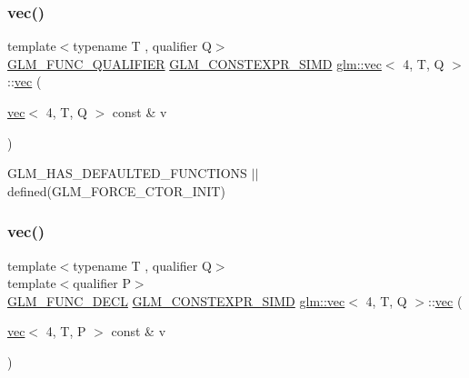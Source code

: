 \subsubsection{\texorpdfstring{vec()}{vec()}\hspace{0.1cm}{\footnotesize\ttfamily [2/34]}}
{\footnotesize\ttfamily template$<$typename T , qualifier Q$>$ \\
\hyperlink{setup_8hpp_a33fdea6f91c5f834105f7415e2a64407}{G\+L\+M\+\_\+\+F\+U\+N\+C\+\_\+\+Q\+U\+A\+L\+I\+F\+I\+ER} \hyperlink{setup_8hpp_ae5de828d10226b21e2123dd61f3cb5ed}{G\+L\+M\+\_\+\+C\+O\+N\+S\+T\+E\+X\+P\+R\+\_\+\+S\+I\+MD} \hyperlink{structglm_1_1vec}{glm\+::vec}$<$ 4, T, Q $>$\+::\hyperlink{structglm_1_1vec}{vec} (\begin{DoxyParamCaption}\item[{\hyperlink{structglm_1_1vec}{vec}$<$ 4, T, Q $>$ const \&}]{v }\end{DoxyParamCaption})}



G\+L\+M\+\_\+\+H\+A\+S\+\_\+\+D\+E\+F\+A\+U\+L\+T\+E\+D\+\_\+\+F\+U\+N\+C\+T\+I\+O\+NS $\vert$$\vert$ defined(\+G\+L\+M\+\_\+\+F\+O\+R\+C\+E\+\_\+\+C\+T\+O\+R\+\_\+\+I\+N\+I\+T) 

\mbox{\label{structglm_1_1vec_3_014_00_01_t_00_01_q_01_4_a7f8d760e50fc7fb597c88ee4bf5bbcc2}} 
\subsubsection{\texorpdfstring{vec()}{vec()}\hspace{0.1cm}{\footnotesize\ttfamily [3/34]}}
{\footnotesize\ttfamily template$<$typename T , qualifier Q$>$ \\
template$<$qualifier P$>$ \\
\hyperlink{setup_8hpp_ab2d052de21a70539923e9bcbf6e83a51}{G\+L\+M\+\_\+\+F\+U\+N\+C\+\_\+\+D\+E\+CL} \hyperlink{setup_8hpp_ae5de828d10226b21e2123dd61f3cb5ed}{G\+L\+M\+\_\+\+C\+O\+N\+S\+T\+E\+X\+P\+R\+\_\+\+S\+I\+MD} \hyperlink{structglm_1_1vec}{glm\+::vec}$<$ 4, T, Q $>$\+::\hyperlink{structglm_1_1vec}{vec} (\begin{DoxyParamCaption}\item[{\hyperlink{structglm_1_1vec}{vec}$<$ 4, T, P $>$ const \&}]{v }\end{DoxyParamCaption})}

